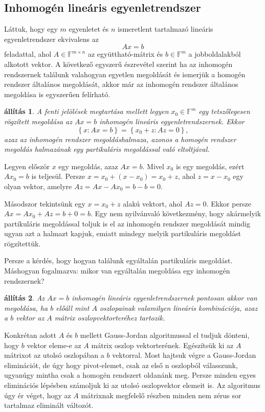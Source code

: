\documentclass[9pt, a4paper, showtrims]{memoir}
\makeatletter
\renewenvironment{proof}[1][\proofname]
    {\par\pushQED{\qed}%
    \normalfont \topsep6\p@\@plus6\p@\relax
    \trivlist
    \item[\hskip\labelsep
        \itshape
    #1\@addpunct{:}]\ignorespaces}
    {\popQED\endtrivlist\@endpefalse}
\theoremstyle{plain}
\newtheorem{proposition}{állítás}[chapter]
\theoremstyle{remark}
\theoremstyle{definition}
\makeatother
\begin{document}
\subsection{Inhomogén lineáris egyenletrendszer}
Láttuk, hogy egy $m$ egyenletet és $n$ ismeretlent tartalmazó lineáris egyenletrendszer ekvivalens az 
\[
    Ax=b
\]
feladattal, ahol $A\in\mathbb{F}^{m\times n}$ az együttható-mátrix és $b\in\mathbb{F}^m$
a jobboldalakból alkotott vektor.
A következő egyszerű észrevétel szerint ha az inhomogén rendszernek találunk valahogyan egyetlen megoldását és ismerjük a homogén rendszer általános megoldását,
akkor már az inhomogén rendszer általános megoldása is egyszerűen felírható.
\begin{proposition}
    A fenti jelölések megtartása mellett
    legyen $x_0\in\mathbb{F}^m$ egy tetszőlegesen rögzített megoldása az $Ax=b$ inhomogén lineáris egyenletrendszernek.
    Ekkor
    \[
        \left\{ x:Ax=b \right\}
        =
        \left\{ x_0+z:Az=0 \right\},
    \]
    azaz az inhomogén rendszer megoldáshalmaza, 
    azonos a homogén rendszer megoldás halmazának egy partikuláris megoldással való 
    eltoltjával.
\end{proposition}
\begin{proof}
    Legyen először $x$ egy megoldás, azaz $Ax=b$. 
    Mivel $x_0$ is egy megoldás, ezért $Ax_{0}=b$ is teljesül.
    Persze $x=x_0+\left( x-x_0 \right)=x_0+z$, ahol $z=x-x_0$ egy olyan vektor,
    amelyre $Az=Ax-Ax_0=b-b=0$.

    Másodszor tekintsünk egy $x=x_0+z$ alakú vektort, ahol $Az=0$.
    Ekkor persze $Ax=Ax_0+Az=b+0=b$.
\end{proof}
Egy nem nyilvánvaló következmény, 
hogy akármelyik partikuláris megoldással toljuk is el az
inhomogén rendszer megoldását mindig ugyan azt a halmazt kapjuk, 
emiatt mindegy melyik partikuláris megoldást rögzítettük.

Persze a kérdés, hogy hogyan találunk egyáltalán partikuláris megoldást.
Máshogyan fogalmazva: mikor van egyáltalán megoldása egy inhomogén rendszernek?
\begin{proposition}
    Az $Ax=b$ inhomogén lineáris egyenletrendszernek pontosan akkor van megoldása, 
    ha $b$ előáll mint $A$ oszlopainak valamilyen lineáris kombinációja, 
    azaz a $b$ vektor az $A$ mátrix oszlopvektorteréhez tartozik.
\end{proposition}
Konkrétan adott $A$ és $b$ mellett Gauss-Jordan algoritmussal  el tudjuk dönteni, hogy
$b$ vektor eleme-e az $A$ mátrix oszlop vektorterének.
Egészítsük ki az $A$ mátrixot az utolsó oszlopában a $b$ vektorral.
Most hajtsuk végre a Gauss-Jordan eliminációt, de úgy hogy pivot-elemet,
csak az első n oszlopból válasszunk, ugyanúgy mintha csak a homogén rendszert oldanánk meg.
Persze minden egyes eliminációs lépésben számoljuk ki az utolsó oszlopvektor elemeit is.
Az algoritmus úgy ér véget, 
hogy az $A$ mátrixnak megfelelő részben minden nem zérus sor tartalmaz eliminált változót.
\end{document}
